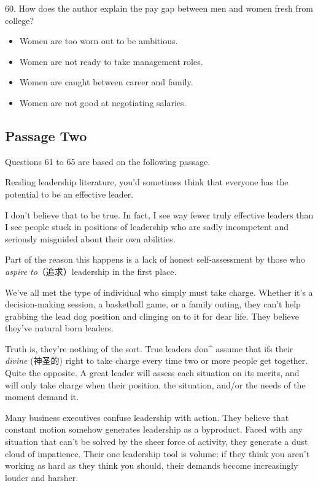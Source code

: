 \documentclass[UTF8,11pt]{ctexart}
\begin{document}
60. How does the author explain the pay gap between men and women fresh from college?


\begin{itemize}[leftmargin=2em,itemsep=.2em,topsep=.4em]\item[A.] Women are too worn out to be ambitious.
\item[B.] Women are not ready to take management roles.
\item[C.] Women are caught between career and family.
\item[D.] Women are not good at negotiating salaries.
\end{itemize}

\subsection*{Passage Two}


Questions 61 to 65 are based on the following passage.


Reading leadership literature, you’d sometimes think that everyone has the potential to be an effective leader.


I don’t believe that to be true. In fact, I see way fewer truly effective leaders than I see people stuck in positions of leadership who are sadly incompetent and seriously misguided about their own abilities.


Part of the reason this happens is a lack of honest self-assessment by those who\textit{ aspire to}（追求）leadership in the first place.


We’ve all met the type of individual who simply must take charge. Whether it’s a decision-making session, a basketball game, or a family outing, they can’t help grabbing the lead dog position and clinging on to it for dear life. They believe they’ve natural born leaders.


Truth is, they’re nothing of the sort. True leaders don\textasciicircum{} assume that ifs their\textit{ divine} (神圣的) right to take charge every time two or more people get together. Quite the opposite. A great leader will assess each situation on its merits, and will only take charge when their position, the situation, and/or the needs of the moment demand it.


Many business executives confuse leadership with action. They believe that constant motion somehow generates leadership as a byproduct. Faced with any situation that can’t be solved by the sheer force of activity, they generate a dust cloud of impatience. Their one leadership tool is volume: if they think you aren’t working as hard as they think you should, their demands become increasingly louder and harsher.
\end{document}
